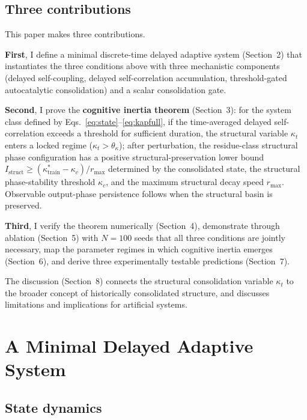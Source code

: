 \subsection{Three contributions}

This paper makes three contributions.

\textbf{First}, I define a minimal discrete-time delayed adaptive system (Section~2) that instantiates the three conditions above with three mechanistic components (delayed self-coupling, delayed self-correlation accumulation, threshold-gated autocatalytic consolidation) and a scalar consolidation gate.

\textbf{Second}, I prove the \textbf{cognitive inertia theorem} (Section~3): for the system class defined by Eqs.~\eqref{eq:state}--\eqref{eq:kapfull}, if the time-averaged delayed self-correlation exceeds a threshold for sufficient duration, the structural variable $\kappa_t$ enters a locked regime ($\kappa_t > \theta_\kappa$); after perturbation, the residue-class structural phase configuration has a positive structural-preservation lower bound $I_{\mathrm{struct}} \geq (\kappa^*_{\mathrm{train}} - \kappa_c)/r_{\max}$ determined by the consolidated state, the structural phase-stability threshold $\kappa_c$, and the maximum structural decay speed $r_{\max}$. Observable output-phase persistence follows when the structural basin is preserved.

\textbf{Third}, I verify the theorem numerically (Section~4), demonstrate through ablation (Section~5) with $N=100$ seeds that all three conditions are jointly necessary, map the parameter regimes in which cognitive inertia emerges (Section~6), and derive three experimentally testable predictions (Section~7).

The discussion (Section~8) connects the structural consolidation variable $\kappa_t$ to the broader concept of historically consolidated structure, and discusses limitations and implications for artificial systems.

\section{A Minimal Delayed Adaptive System}

\subsection{State dynamics}

